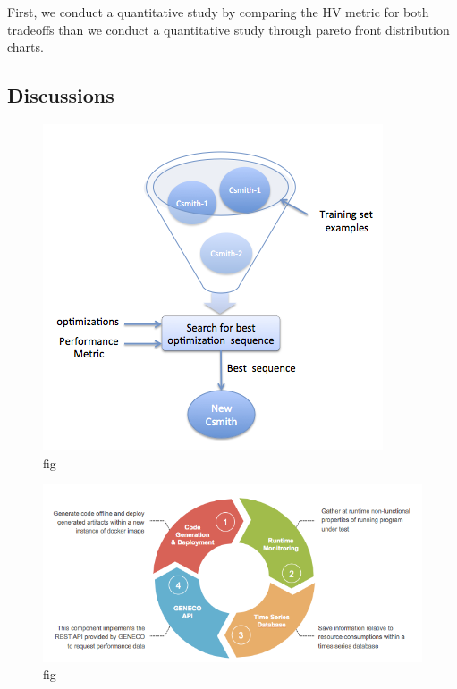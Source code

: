 First, we conduct a quantitative study by comparing the HV metric for both tradeoffs than we conduct a quantitative study through pareto front distribution charts.
\subsection{Discussions}










\begin{figure}[!t]
	\centering
	\includegraphics[width=1\hsize]{Ressources/approach by example.png}
	\caption{fig}
\end{figure}

\begin{figure}[!t]
	\centering
	\includegraphics[width=1\hsize]{Ressources/geneco approach.png}
	\caption{fig}
\end{figure}

